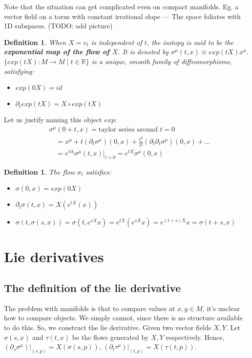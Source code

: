 \documentclass[11pt]{book}
\newcommand{\R}{\ensuremath{\mathbb R}}
\newtheorem{definition}[theorem]{Definition}
\begin{document}
Note that the situation can get complicated even on compact manifolds. Eg. a
vector field on a torus with constant irrational slope --- The space foliates
with 1D subspaces. (TODO: add picture)


\begin{definition}
    When $X = v_t$ is independent of $t$, the isotopy is said to be the
    \textbf{exponential map of the flow of $X$}. It is denoted by
    $\sigma^\mu(t, x) \equiv exp(tX) x^\mu$.
    $\{ exp(tX): M \rightarrow M \mid t \in \R \}$ is a unique,
    smooth family of diffeomorphisms, satisfying:
    \begin{itemize}
        \item $exp(0X) = id$
        \item $\partial_t exp(tX) = X \circ exp(tX)$
    \end{itemize}
\end{definition}

Let us justify naming this object $exp$:
\begin{align*}
    &\sigma^\mu(0 + t, x) = \text{taylor series around $t = 0$} \\
    &\quad = x^\mu + t (\partial_t \sigma^\mu)(0, x) + \frac{t^2}{2!} (\partial_t \partial_t \sigma^\mu)(0, x) + \dots \\
    &\quad = e^{t \partial_t} \sigma^\mu(t, x) |_{t=0} = e^{t X} \sigma^\mu(0, x)
\end{align*}

\begin{definition}
    The flow $\sigma_t$ satisfies:
    \begin{itemize}
        \item $\sigma(0, x) = exp(0X)$
        \item $\partial_t \sigma(t, x) = X(e^{tX}(x))$
        \item $\sigma(t, \sigma(s, x)) = \sigma(t, e^{sX} x) = e^{tX} (e^{sX} x) = e^{(t+s)X} x = \sigma(t + s, x)$
    \end{itemize}
\end{definition}

\chapter{Lie derivatives}
\section{The definition of the lie derivative}
The problem with manifolds is that to compare values at $x, y \in M$, it's
unclear how to compare objects. We simply cannot, since there is no structure
available to do this. So, we construct the lie derivative. Given two vector
fields $X, Y$. Let $\sigma(s, x)$ and $\tau(t, x)$ be the flows generated
by $X, Y$ respectively. Hence, $(\partial_s \sigma^\mu)|_{(s, p)} = X(\sigma(s, p))$,
$(\partial_t \tau^\mu)|_{(t, p)} = X(\tau(t, p))$.
\end{document}
